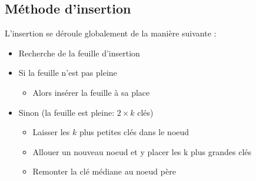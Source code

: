 \subsection{Méthode d’insertion}
L’insertion se déroule globalement de la manière suivante :
\begin{itemize}
\item Recherche de la feuille d’insertion
\item Si la feuille n’est pas pleine
\begin{itemize}
\item Alors insérer la feuille à sa place
\end{itemize}
\item Sinon (la feuille est pleine: $2 \times k$ clés)
\begin{itemize}
\item Laisser les $k$ plus petites clés dans le noeud
\item Allouer un nouveau noeud et y placer les k plus grandes clés
\item Remonter la clé médiane au noeud père
\end{itemize}
\end{itemize}
